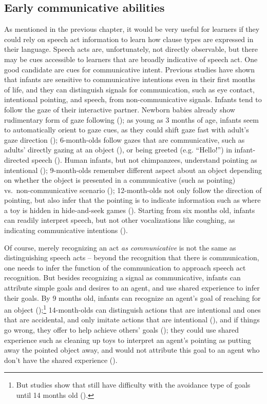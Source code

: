 \subsection{Early communicative abilities}
\label{sec:bg:acq:pre}
As mentioned in the previous chapter, it would be very useful for learners if they could rely on speech act information to learn how clause types are expressed in their language. Speech acts are, unfortunately, not directly observable, but there may be cues accessible to learners that are broadly indicative of speech act. One good candidate are cues for communicative intent.
Previous studies have shown that infants are sensitive to %
communicative intentions even in their first months of life, and they can distinguish signals for communication, such as eye contact, intentional pointing, and speech, from non-communicative signals. Infants tend to follow the gaze of their interactive partner. Newborn babies already show rudimentary form of gaze following (\cite{farroni2004gaze}); as young as 3 months of age, infants seem to automatically orient to gaze cues, as they could shift gaze fast with adult’s gaze direction (\cite{hood1998gaze}); 6-month-olds follow gazes that are communicative, such as adults' directly gazing at an object (\cite{gredeback2008gaze}), or being greeted (e.g. ``Hello!'') in infant-directed speech (\cite{senju2008gaze}). Human infants, but not chimpanzees, understand pointing as intentional (\cite{pika2006point, povinelli1997point,morissette1995joint}); 9-month-olds remember different aspect about an object depending on whether the object is presented in a communicative (such as pointing) vs.\ non-communicative scenario (\cite{yoon2008intent}); 12-month-olds not only follow the direction of pointing, but also infer that the pointing is to indicate information such as where a toy is hidden in hide-and-seek games (\cite{behne2005hide,behne2012point}). Starting from six months old, infants can readily interpret speech, but not other vocalizations like coughing, as indicating communicative intentions (\cite{vouloumanos2014intent}).

Of course, merely recognizing an act \emph{as communicative} is not the same as distinguishing speech acts -- beyond the recognition that there is communication, one needs to infer the function of the communication to approach speech act recognition.
But besides recognizing a signal as communicative, infants can attribute simple goals and desires to an agent, and use shared experience to infer their goals. By 9 months old, infants can recognize an agent's goal of reaching for an object (\cite{woodward1998goal,baldwin2001goal});\footnote{But studies show that still have difficulty with the avoidance type of goals until 14 months old (\cite{feiman2015goals}).} 14-month-olds can distinguish actions that are intentional and ones that are accidental, and only imitate actions that are intentional (\cite{carpenter1998intent,sakkalou2013goal}), and if things go wrong, they offer to help achieve others' goals (\cite{warneken2007goalrecog}); they could use shared experience such as cleaning up toys to interpret an agent's pointing as putting away the pointed object away, and would not attribute this goal to an agent who don't have the shared experience (\cite{liebal2009goal}).

